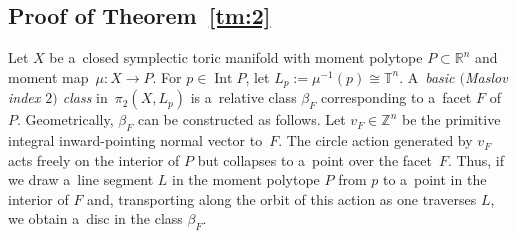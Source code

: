 \documentclass[pdftex]{sigma}
\numberwithin{equation}{section}
\newcommand{\bR}{{\mathbb R}}
\newcommand{\bT}{{\mathbb T}}
\theoremstyle{definition}
\begin{document}
\subsection{Proof of Theorem~\ref{tm:2}}

Let $X$ be a~closed symplectic toric manifold with moment polytope $P\subset \bR^n$ and moment map~${\mu\colon X\to P}$.
For $p\in \operatorname{Int} P$, let $L_p:=\mu^{-1}(p)\cong \bT^n$. A~\emph{basic $($Maslov index $2)$ class} in~$\pi_2(X,L_p)$ is a~relative class $\beta_F$ corresponding to a~facet $F$ of $P$.
Geometrically, $\beta_F$ can be constructed as follows. Let $v_F \in \mathbb{Z}^n$ be the primitive integral inward-pointing normal vector to~$F$. The circle action generated by $v_F$ acts freely on the interior of $P$ but collapses to a~point over the facet~$F$. Thus, if we draw a~line segment $L$ in the moment polytope $P$ from $p$ to a~point in the interior of $F$ and, transporting along the orbit of this action as one traverses $L$, we obtain a~disc in the class $\beta_F$.
\end{document}
